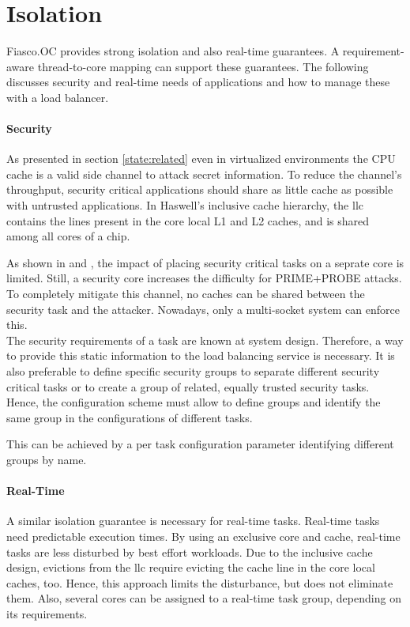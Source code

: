\section{Isolation}
\label{design:isolation}

Fiasco.OC provides strong isolation and also real-time guarantees.
A requirement-aware thread-to-core mapping can support these guarantees.
The following discusses security and real-time needs of applications and how to
manage these with a load balancer.

\paragraph{Security}
As presented in section \ref{state:related} even in virtualized environments
the CPU cache is a valid side channel to attack secret information.
To reduce the channel's throughput, security critical applications should share
as little cache as possible with untrusted applications.
In Haswell's inclusive cache hierarchy, the \gls{llc} contains the lines
present in the core local L1 and L2 caches, and is shared among all cores of a
chip.

As shown in \cite{inci_seriously_2015} and \cite{liu_last-level_2015},
the impact of placing security critical tasks on a seprate core is limited.
Still, a security core increases the difficulty for PRIME+PROBE attacks.
To completely mitigate this channel, no caches can be shared between the
security task and the attacker.
Nowadays, only a multi-socket system can enforce this.
\\

The security requirements of a task are known at system design.
Therefore, a way to provide this static information to the load balancing
service is necessary.
It is also preferable to define specific security groups to separate different
security critical tasks or to create a group of related, equally trusted
security tasks.
Hence, the configuration scheme must allow to define groups and identify the
same group in the configurations of different tasks.

This can be achieved by a per task configuration parameter identifying
different groups by name.


\paragraph{Real-Time}
A similar isolation guarantee is necessary for real-time tasks.
Real-time tasks need predictable execution times.
By using an exclusive core and cache, real-time tasks are less disturbed by best
effort workloads.
Due to the inclusive cache design, evictions from the \gls{llc} require
evicting the cache line in the core local caches, too.
Hence, this approach limits the disturbance, but does not eliminate them.
Also, several cores can be assigned to a real-time task group, depending on its
requirements.

